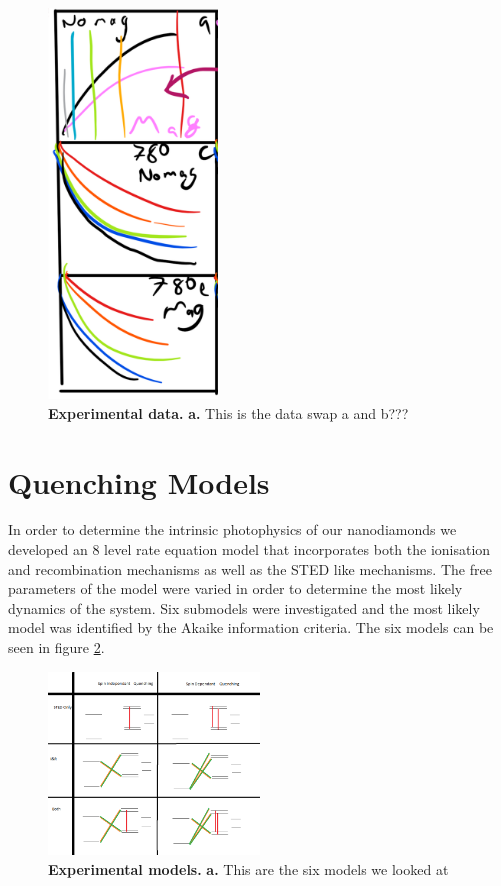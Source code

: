 \documentclass[,prl,twocolumn]{revtex4}
\begin{document}
\begin{figure}[H]
  \centering
  \includegraphics[width=0.4\textwidth]{Data2.png} 
 \caption{\textbf{Experimental data.} \textbf{a.} This is the data swap a and b???} \label{FigData}
\end{figure}


\section{Quenching Models}
In order to determine the intrinsic photophysics of our nanodiamonds we developed an 8 level rate equation model that incorporates both the ionisation and recombination mechanisms as well as the STED like mechanisms. The free parameters of the model were varied in order to determine the most likely dynamics of the system. Six submodels were investigated and the most likely model was identified by the Akaike information criteria. The six models can be seen in figure \ref{FigModels}.

\begin{figure}[H]
  \centering
  \includegraphics[width=0.5\textwidth]{models.png} 
 \caption{\textbf{Experimental models.} \textbf{a.} This are the six models we looked at} \label{FigModels}
\end{figure}
\end{document}
